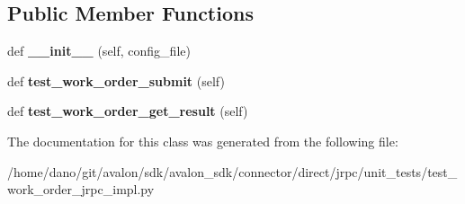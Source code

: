 \subsection*{Public Member Functions}
\begin{DoxyCompactItemize}
\item 
\mbox{\label{classtest__work__order__jrpc__impl_1_1TestWorkOrderJRPCImpl_aa3f028f68a6cc6cbc5484b17a58b9814}} 
def {\bfseries \+\_\+\+\_\+init\+\_\+\+\_\+} (self, config\+\_\+file)
\item 
\mbox{\label{classtest__work__order__jrpc__impl_1_1TestWorkOrderJRPCImpl_a70f0676b0ab461130a879b5d29b2e1c2}} 
def {\bfseries test\+\_\+work\+\_\+order\+\_\+submit} (self)
\item 
\mbox{\label{classtest__work__order__jrpc__impl_1_1TestWorkOrderJRPCImpl_a8e5a05257d8e20b809a3a806021bee59}} 
def {\bfseries test\+\_\+work\+\_\+order\+\_\+get\+\_\+result} (self)
\end{DoxyCompactItemize}


The documentation for this class was generated from the following file\+:\begin{DoxyCompactItemize}
\item 
/home/dano/git/avalon/sdk/avalon\+\_\+sdk/connector/direct/jrpc/unit\+\_\+tests/test\+\_\+work\+\_\+order\+\_\+jrpc\+\_\+impl.\+py\end{DoxyCompactItemize}
